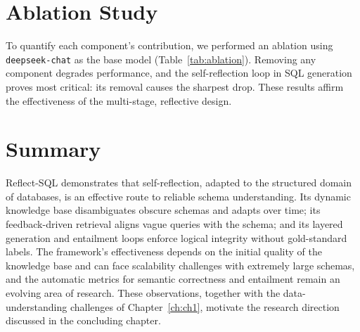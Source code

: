 \section{Ablation Study}
To quantify each component's contribution, we performed an ablation using \texttt{deepseek-chat} as the base model (Table~\ref{tab:ablation}). Removing any component degrades performance, and the self-reflection loop in SQL generation proves most critical: its removal causes the sharpest drop. These results affirm the effectiveness of the multi-stage, reflective design.

\begin{table}[ht]
\centering
\footnotesize
{}
\caption{Ablation results showing the contribution of each module.}
\label{tab:ablation}
\end{table}

\section{Summary}
Reflect-SQL demonstrates that self-reflection, adapted to the structured domain of databases, is an effective route to reliable schema understanding. Its dynamic knowledge base disambiguates obscure schemas and adapts over time; its feedback-driven retrieval aligns vague queries with the schema; and its layered generation and entailment loops enforce logical integrity without gold-standard labels. The framework's effectiveness depends on the initial quality of the knowledge base and can face scalability challenges with extremely large schemas, and the automatic metrics for semantic correctness and entailment remain an evolving area of research. These observations, together with the data-understanding challenges of Chapter~\ref{ch:ch1}, motivate the research direction discussed in the concluding chapter.
